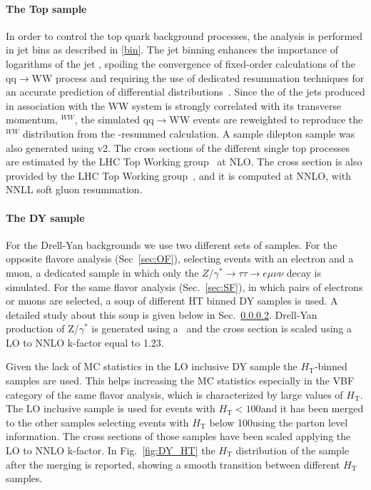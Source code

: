 \paragraph{The Top sample}
In order to control the top quark background processes, the analysis is
performed in jet bins as described in \ref{bin}. The jet binning enhances the importance of logarithms of the jet \pt, spoiling the convergence of 
fixed-order calculations of the qq$\rightarrow$WW process and requiring the use of dedicated resummation techniques for an
accurate prediction of differential distributions~\cite{Meade:2014fca,Jaiswal:2014yba}.  
Since the \pt of the jets produced in association with the WW system is strongly correlated with its transverse momentum, 
\pt$^{WW}$,  the simulated qq$\rightarrow$WW events are reweighted  
to reproduce the \pt$^{WW}$ distribution from the \pt-resummed calculation.
A \ttbar sample dilepton sample was also generated using \POWHEG v2. 
The cross sections of the different single top processes are estimated by the LHC Top Working group~\cite{singletop} at NLO.
The \ttbar cross section is also provided by the LHC Top Working group~\cite{topxsec}, and it is computed at NNLO, with NNLL soft gluon resummation. 






\paragraph{The DY sample}\label{sec:DY}

For the Drell-Yan backgrounds we use two different sets of samples. 
For the opposite flavore analysis (Sec~\ref{sec:OF}), selecting events with an
electron and a muon, a dedicated sample in which only the
$Z/\gamma^{*}\rightarrow{}\tau\tau\rightarrow{e\mu\nu\nu}$ decay is simulated.
For the same flavor analysis (Sec.~\ref{sec:SF}), in which pairs of electrons
or muons are selected, a soup of different HT binned DY samples is used. A
detailed study about this soup is given below in Sec.~\ref{sec:DY}.
Drell-Yan production of Z/$\gamma^{*}$ is generated using a\MADGRAPH~\cite{Alwall:2014hca} and the cross section is scaled using a LO to NNLO k-factor equal to 1.23. 



Given the lack of MC statistics in the LO inclusive DY sample the
$H_\mathrm{T}$-binned samples are used. This helps increasing the MC
statistics especially in the VBF category of the same flavor analysis, which is characterized by large values of $H_\mathrm{T}$.
The LO inclusive sample is used for events with $H_\mathrm{T} < 100$\GeV and it has been merged to the other samples selecting events with $H_\mathrm{T}$ below 100\GeV using the parton level information. The cross sections of those samples have been scaled applying the LO to NNLO k-factor. In Fig.~\ref{fig:DY_HT} the $H_\mathrm{T}$ distribution of the sample after the merging is reported, showing a smooth transition between different $H_\mathrm{T}$ samples.


